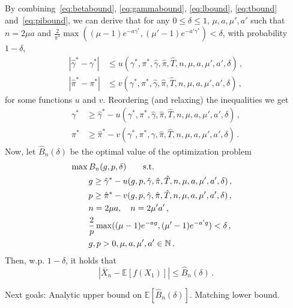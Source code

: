 \documentclass[11pt]{article}
\newcommand{\EE}[1]{\mathbb{E}\left[#1\right]}
\theoremstyle{plain}
\theoremstyle{definition}
\theoremstyle{remark}
\begin{document}
By combining~\eqref{eq:betabound},
\eqref{eq:gammabound}, \eqref{eq:lbound}, \eqref{eq:tbound} and~\eqref{eq:pibound}, we can derive 
that for any $0\le \delta \le 1$,
 $\mu,a,\mu',a'$  such that $n = 2\mu a$ and
 $\frac{2}{\pi^*} \max( (\mu-1)e^{-a\gamma^*}, (\mu'-1)e^{-a'\gamma^*} )<\delta$, 
with probability $1-\delta$,
\begin{align*}
|\hat{\gamma}^* - \gamma^* | &\le u( \gamma^*, \pi^*, \hat{\gamma}, \hat\pi, \hat T, n, \mu, a, \mu', a', \delta )\,,\\
|\hat{\pi}^* - \pi^* | &\le v( \gamma^*, \pi^*, \hat{\gamma}, \hat\pi, \hat T, n, \mu, a, \mu', a', \delta )\,,
\end{align*}
for some functions $u$ and $v$.
Reordering (and relaxing) the  inequalities we get
\begin{align*}
\gamma^* &\ge \hat\gamma^* - u( \gamma^*, \pi^*, \hat{\gamma}, \hat\pi, \hat T, n, \mu, a, \mu', a', \delta )\,,\\
 \pi^*  &\ge \hat{\pi}^* - v( \gamma^*, \pi^*, \hat{\gamma}, \hat\pi, \hat T, n, \mu, a, \mu', a', \delta )\,.
\end{align*}
Now, let $\hat{B}_n(\delta)$ be the optimal value of the optimization problem 
\begin{align*}
\lefteqn{\max B_n(g,p,\delta)\qquad \text{s.t.} }\\
&\qquad  g \ge \hat\gamma^* - u( g, p, \hat{\gamma}, \hat\pi, \hat T, n, \mu, a, \mu', a', \delta )\,,\\
&\qquad p  \ge \hat{\pi}^* - v( g, p, \hat{\gamma}, \hat\pi, \hat T, n, \mu, a, \mu', a', \delta )\,,\\
&\qquad n = 2\mu a, \quad n = 2\mu' a'\,,\\
&\qquad \frac{2}{p} \max( (\mu-1)e^{-ag}, (\mu'-1)e^{-a'g} )<\delta\,,\\
&\qquad g,p >0, \mu,a,\mu',a'\in \N\,.
\end{align*}
Then, w.p. $1-\delta$, it holds that
\[
|\bar{X}_n - \EE{f(X_1)}| \le \hat{B}_n(\delta)\,.
\]

Next goals: Analytic upper bound on $\EE{ \hat{B}_n(\delta)}$.
Matching lower bound.




\end{document}
